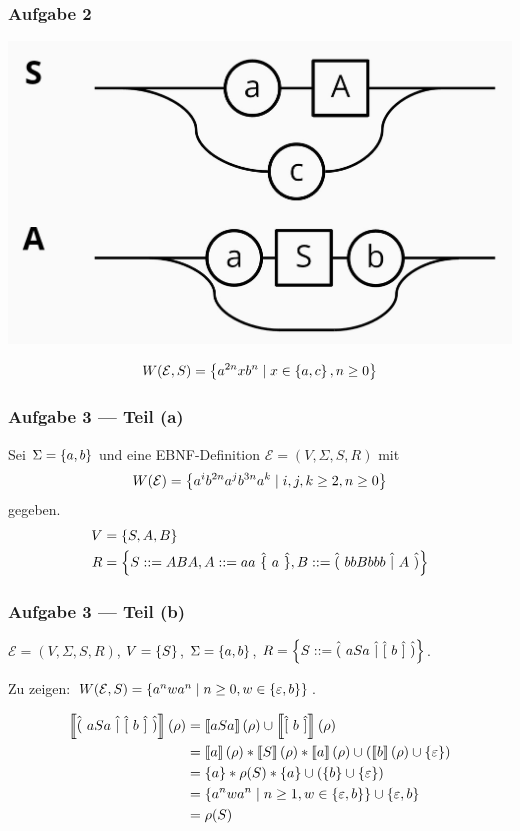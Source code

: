 \documentclass{beamer}
\newcommand{\wdh}[1]{\hat{\{} \ #1 \ \hat{\}}}
\newcommand{\opt}[2]{\hat{(} \ #1 \ \hat{|} \ #2 \ \hat{)}}
\newcommand{\byp}[1]{\hat{[} \ #1 \ \hat{]}}
\newcommand{\sem}[1]{\left\llbracket #1 \right\rrbracket}
\begin{document}
\begin{frame} \frametitle{Aufgabe 2}
	\begin{center}
		\includegraphics[width=.5\textwidth]{tut03_syntax_dia_2a.jpg}
	\end{center}

	\begin{equation*}
		W(\mathcal{E},S) = \left\{ a^{2n} x b^n \mid x \in \left\{ a,c \right\}, n \ge 0 \right\}
	\end{equation*}
\end{frame}

\begin{frame} \frametitle{Aufgabe 3 --- Teil (a)}
	Sei $\Sigma = \left\{ a,b \right\}$ und eine EBNF-Definition $\mathcal{E} = (V,\Sigma,S,R)$ mit 
	\begin{equation*}
		W(\mathcal{E}) = \left\{ a^i b^{2n} a^j b^{3n} a^k \mid i,j,k \ge 2, n \ge 0 \right\} 
	\end{equation*}
	gegeben. \pause
	\begin{align*}
		V &= \menge{S,A,B} \\
		R &= \menge{S ::= ABA , A ::= aa \ \wdh{a}, B ::= \opt{bbBbbb}{A}}
	\end{align*}
\end{frame}

\begin{frame} \frametitle{Aufgabe 3 --- Teil (b)}
	$\mathcal{E} = (V,\Sigma,S,R)$, $V = \left\{ S \right\}$, $\Sigma = \left\{ a,b \right\}$, $R = \menge{S ::= \opt{aSa}{\byp{b}}}$. 
	
	Zu zeigen: $W(\mathcal{E},S) = \left\{ a^n w a^n \mid n \ge 0, w \in \left\{ \varepsilon,b \right\} \right\}$.
	
	\pause 
	
	\begin{align*}
		\sem{\opt{aSa}{\byp{b}}}(\rho) 
		&= \sem{aSa}(\rho) \cup \sem{\byp{b}}(\rho) \\
		&= \sem{a}(\rho) * \sem{S}(\rho) * \sem{a}(\rho) \cup \brackets{\sem{b}(\rho) \cup \menge{\epsilon}} \\
		&= \menge{a} * \rho(S) * \menge{a} \cup \brackets{\menge{b} \cup \menge{\epsilon}} \\
		&= \menge{a^n w a^n \mid n \ge 1, w \in \menge{\epsilon, b}} \cup \menge{\epsilon,b} \\
		&= \rho(S)
	\end{align*}
\end{frame}
\end{document}
